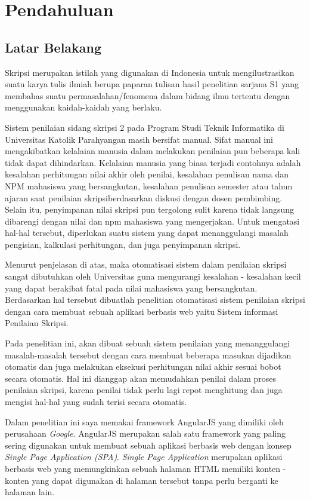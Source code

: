 \chapter{Pendahuluan}
\label{chap:pendahuluan}

\section{Latar Belakang}
\label{sec:latarBelakang}

	Skripsi merupakan istilah yang digunakan di Indonesia untuk mengilustrasikan suatu karya tulis ilmiah berupa paparan tulisan hasil penelitian sarjana S1 yang membahas suatu permasalahan/fenomena dalam bidang ilmu tertentu dengan menggunakan kaidah-kaidah yang berlaku.
	
	Sistem penilaian sidang skripsi 2 pada Program Studi Teknik Informatika di Universitas Katolik Parahyangan masih bersifat manual. Sifat manual ini mengakibatkan kelalaian manusia dalam melakukan penilaian pun beberapa kali tidak dapat dihindarkan. Kelalaian manusia yang biasa terjadi contohnya adalah kesalahan perhitungan nilai akhir oleh penilai, kesalahan penulisan nama dan NPM mahasiswa yang bersangkutan, kesalahan penulisan semester atau tahun ajaran saat penilaian skripsi{\footnotesize berdasarkan diskusi dengan dosen pembimbing}. Selain itu, penyimpanan nilai skripsi pun tergolong sulit karena tidak langsung dibarengi dengan nilai dan npm mahasiswa yang mengerjakan. Untuk mengatasi hal-hal tersebut, diperlukan suatu sistem yang dapat menanggulangi masalah pengisian, kalkulasi perhitungan, dan juga penyimpanan skripsi.
	
	Menurut penjelasan di atas, maka otomatisasi sistem dalam penilaian skripsi sangat dibutuhkan oleh Universitas guna mengurangi kesalahan - kesalahan kecil yang dapat berakibat fatal pada nilai mahasiswa yang bersangkutan. Berdasarkan hal tersebut dibuatlah penelitian otomatisasi sistem penilaian skripsi dengan cara membuat sebuah aplikasi berbasis web yaitu Sistem informasi Penilaian Skripsi.
		
	Pada penelitian ini, akan dibuat sebuah sistem penilaian yang menanggulangi masalah-masalah tersebut dengan cara membuat beberapa masukan dijadikan otomatis dan juga melakukan eksekusi perhitungan nilai akhir sesuai bobot secara otomatis. Hal ini dianggap akan memudahkan penilai dalam proses penilaian skripsi, karena penilai tidak perlu lagi repot menghitung dan juga mengisi hal-hal yang sudah terisi secara otomatis.
	
	Dalam penelitian ini saya memakai framework AngularJS yang dimiliki oleh perusahaan \textit{Google}. AngularJS merupakan salah satu framework yang paling sering digunakan untuk membuat sebuah aplikasi berbasis web dengan konsep \textit{Single Page Application (SPA)}. \textit{Single Page Application} merupakan aplikasi berbasis web yang memungkinkan sebuah halaman HTML memiliki konten - konten yang dapat digunakan di halaman tersebut tanpa perlu berganti ke halaman lain.
	
